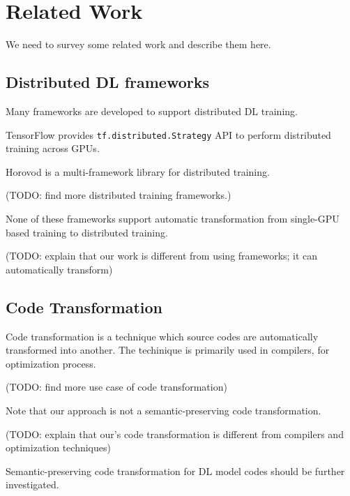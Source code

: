 \section{Related Work}\label{sec:related}
We need to survey some related work and describe them here.

\subsection{Distributed DL frameworks}

Many frameworks are developed to support distributed DL training.

TensorFlow provides {\tt tf.distributed.Strategy} API to perform
distributed training across GPUs.
 
Horovod is a multi-framework library for distributed training.

(TODO: find more distributed training frameworks.)

None of these frameworks support automatic transformation from single-GPU
based training to distributed training. 

(TODO: explain that our work is different from using frameworks;
it can automatically transform)

\subsection{Code Transformation}

Code transformation is a technique which source codes are automatically
transformed into another. The techinique is primarily used in compilers,
for optimization process. 

(TODO: find more use case of code transformation)

Note that our approach is not a semantic-preserving code transformation.

(TODO: explain that our's code transformation is different from
compilers and optimization techniques)

Semantic-preserving code transformation for DL model codes should be
further investigated.

